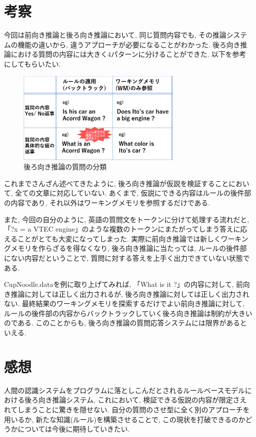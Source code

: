 \documentclass[uplatex,12pt]{jsarticle}
\begin{document}
\section{考察}
今回は前向き推論と後ろ向き推論において, 同じ質問内容でも, その推論システムの機能の違いから, 違うアプローチが必要になることがわかった. 後ろ向き推論における質問の内容には大きく4パターンに分けることができた. 以下を参考にしてもらいたい.

\begin{figure}[htbp]
 \begin{center}
  \includegraphics[width = 8cm, pagebox = cropbox, clip]{images/後ろ向き推論の質問の分類.pdf}
 \end{center}
 \caption[]{後ろ向き推論の質問の分類}\label{fig:fig1.1}
\end{figure}

これまでさんざん述べてきたように, 後ろ向き推論が仮説を検証することにおいて, 全ての文章に対応していない. あくまで, 仮説にできる内容はルールの後件部の内容であり, それ以外はワーキングメモリを参照するだけである.

また, 今回の自分のように, 英語の質問文をトークンに分けて処理する流れだと, 「?x = a VTEC engine」のような複数のトークンにまたがってしまう答えに応えることがとても大変になってしまった. 実際に前向き推論では新しくワーキングメモリを作らざるを得なくなり, 後ろ向き推論に当たっては, ルールの後件部にない内容だということで, 質問に対する答えを上手く出力できていない状態である.

CupNoodle.dataを例に取り上げてみれば, 「What is it ?」の内容に対して, 前向き推論に対しては正しく出力されるが, 後ろ向き推論に対しては正しく出力されない. 最終結果のワーキングメモリを探索するだけでよい前向き推論に対して, ルールの後件部の内容からバックトラックしていく後ろ向き推論は制約が大きいのである. このことからも, 後ろ向き推論の質問応答システムには限界があるといえる.

\section{感想}
人間の認識システムをプログラムに落としこんだとされるルールベースモデルにおける後ろ向き推論システム, これにおいて, 検証できる仮説の内容が限定さえれてしまうことに驚きを隠せない. 自分の質問のさせ型に全く別のアプローチを用いるか, 新たな知識(ルール)を構築させることで, この現状を打破できるのかどうかについては今後に期待していきたい. 
\end{document}
